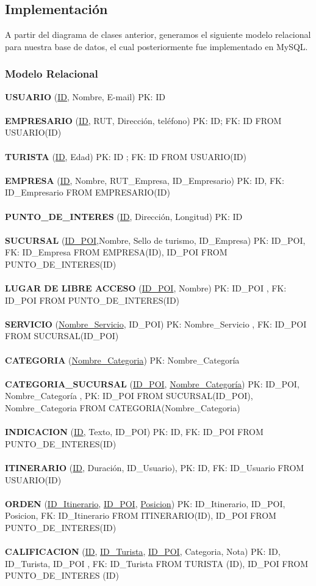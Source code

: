 \documentclass[12pt]{article}
\begin{document}
\subsection{Implementación}
A partir del diagrama de clases anterior, generamos el siguiente modelo relacional para nuestra base de datos, el cual posteriormente fue implementado en MySQL.
\subsubsection{Modelo Relacional}
\textbf{USUARIO} (\underline{ID}, Nombre, E-mail) PK: ID\\\\
\textbf{EMPRESARIO} (\underline{ID}, RUT, Dirección, teléfono) PK: ID; FK: ID FROM USUARIO(ID)\\\\
\textbf{TURISTA} (\underline{ID}, Edad) PK: ID ; FK: ID FROM USUARIO(ID)\\\\
\textbf{EMPRESA} (\underline{ID}, Nombre, RUT\_Empresa, ID\_Empresario) PK: ID, FK: ID\_Empresario FROM EMPRESARIO(ID)\\\\
\textbf{PUNTO\_DE\_INTERES} (\underline{ID}, Dirección, Longitud) PK: ID\\\\
\textbf{SUCURSAL} (\underline{ID\_POI},Nombre, Sello de turismo, ID\_Empresa) PK: ID\_POI, FK: ID\_Empresa FROM EMPRESA(ID), ID\_POI FROM PUNTO\_DE\_INTERES(ID)\\\\
\textbf{LUGAR DE LIBRE ACCESO} (\underline{ID\_POI}, Nombre) PK: ID\_POI , FK: ID\_POI FROM PUNTO\_DE\_INTERES(ID)\\\\
\textbf{SERVICIO} (\underline{Nombre\_Servicio}, ID\_POI) PK: Nombre\_Servicio , FK: ID\_POI FROM SUCURSAL(ID\_POI)\\\\
\textbf{CATEGORIA} (\underline{Nombre\_Categoria}) PK: Nombre\_Categoría\\\\
\textbf{CATEGORIA\_SUCURSAL} (\underline{ID\_POI}, \underline{Nombre\_Categoría}) PK: ID\_POI, Nombre\_Categoría , PK: ID\_POI FROM SUCURSAL(ID\_POI), Nombre\_Categoria FROM CATEGORIA(Nombre\_Categoria)\\\\
\textbf{INDICACION} (\underline{ID}, Texto, ID\_POI) PK: ID, FK: ID\_POI FROM PUNTO\_DE\_INTERES(ID)\\\\
\textbf{ITINERARIO} (\underline{ID}, Duración, ID\_Usuario), PK: ID, FK: ID\_Usuario FROM USUARIO(ID)\\\\
\textbf{ORDEN} (\underline{ID\_Itinerario}, \underline{ID\_POI}, \underline{Posicion}) PK: ID\_Itinerario, ID\_POI, Posicion, FK: ID\_Itinerario FROM ITINERARIO(ID), ID\_POI FROM PUNTO\_DE\_INTERES(ID)\\\\
\textbf{CALIFICACION} (\underline{ID}, \underline{ID\_Turista}, \underline{ID\_POI}, Categoria, Nota) PK: ID, ID\_Turista, ID\_POI , FK: ID\_Turista FROM TURISTA (ID), ID\_POI FROM PUNTO\_DE\_INTERES (ID)
\end{document}
